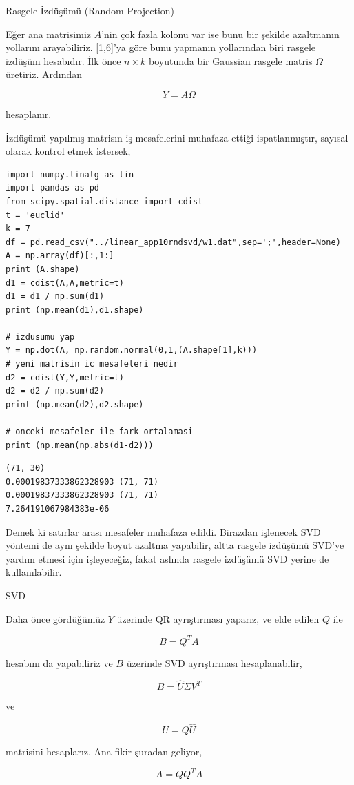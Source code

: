 \documentclass[12pt,fleqn]{article}\usepackage{../../common}
\begin{document}
Rasgele İzdüşümü (Random Projection) 

Eğer ana matrisimiz $A$'nin çok fazla kolonu var ise bunu bir şekilde azaltmanın
yollarını arayabiliriz. [1,6]'ya göre bunu yapmanın yollarından biri rasgele
izdüşüm hesabıdır. İlk önce $n \times k$ boyutunda bir Gaussian rasgele matris
$\Omega$ üretiriz. Ardından

$$ Y = A\Omega $$

hesaplanır. 

İzdüşümü yapılmış matrisın iş mesafelerini muhafaza ettiği ispatlanmıştır,
sayısal olarak kontrol etmek istersek,

\begin{verbatim}
import numpy.linalg as lin
import pandas as pd
from scipy.spatial.distance import cdist
t = 'euclid'
k = 7
df = pd.read_csv("../linear_app10rndsvd/w1.dat",sep=';',header=None)
A = np.array(df)[:,1:]
print (A.shape)
d1 = cdist(A,A,metric=t)
d1 = d1 / np.sum(d1)
print (np.mean(d1),d1.shape)

# izdusumu yap
Y = np.dot(A, np.random.normal(0,1,(A.shape[1],k)))
# yeni matrisin ic mesafeleri nedir
d2 = cdist(Y,Y,metric=t)
d2 = d2 / np.sum(d2)
print (np.mean(d2),d2.shape)

# onceki mesafeler ile fark ortalamasi
print (np.mean(np.abs(d1-d2)))
\end{verbatim}

\begin{verbatim}
(71, 30)
0.00019837333862328903 (71, 71)
0.00019837333862328903 (71, 71)
7.264191067984383e-06
\end{verbatim}

Demek ki satırlar arası mesafeler muhafaza edildi. Birazdan işlenecek SVD
yöntemi de aynı şekilde boyut azaltma yapabilir, altta rasgele izdüşümü
SVD'ye yardım etmesi için işleyeceğiz, fakat aslında rasgele izdüşümü SVD
yerine de kullanılabilir. 

SVD

Daha önce gördüğümüz $Y$ üzerinde QR ayrıştırması yaparız, ve elde edilen $Q$
ile

$$ B = Q^T A $$

hesabını da yapabiliriz ve $B$ üzerinde SVD ayrıştırması hesaplanabilir,

$$ B = \hat{U}\Sigma V^T $$

ve

$$ U = Q\hat{U} $$

matrisini hesaplarız. Ana fikir şuradan geliyor,

$$ A = QQ^TA $$
\end{document}
